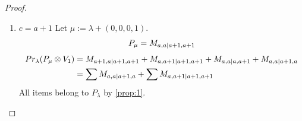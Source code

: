 \documentclass[12pt,a4paper]{article}
\begin{document}
\begin{proof}
\begin{enumerate}
\begin{enumerate}
\item $c=a+1$
        Let $\mu:=\lambda + (0,0,0,1) $. 
\begin{equation}\notag
  \begin{aligned}
      P_{\mu} =M_{a,a|a+1,a+1}
  \end{aligned}
\end{equation}
\begin{equation}\notag
  \begin{aligned}
  Pr_{\lambda}(P_\mu \otimes V_1) &=
M_{a+1,a|a+1,a+1}
+M_{a,a+1|a+1,a+1}
+M_{a,a|a,a+1}
+M_{a,a|a+1,a} \\
                                  &=
\sum M_{a,a|a+1,a}
+\sum M_{a,a+1|a+1,a+1}
  \end{aligned}
\end{equation}
All items belong to $P_\lambda$ by \cref{prop:1}.
  \end{enumerate}


\end{enumerate}
\end{proof}
\end{document}
